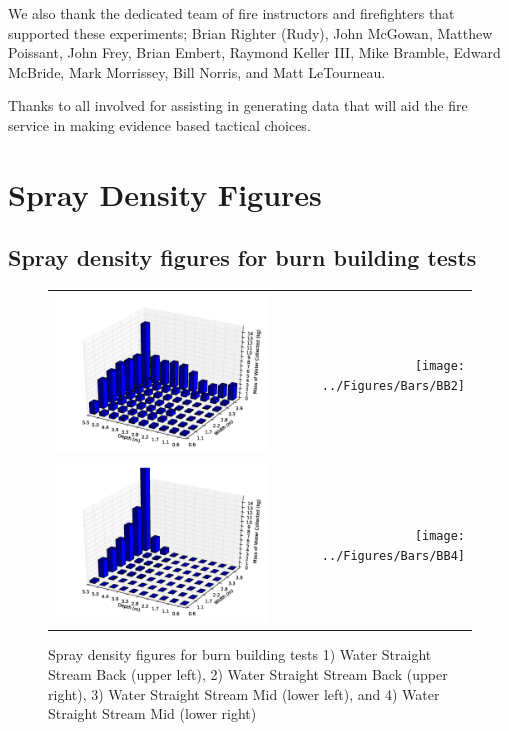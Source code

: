 \documentclass[12pt,oneside]{book}
\begin{document}
We also thank the dedicated team of fire instructors and firefighters that supported these experiments; Brian Righter (Rudy), John McGowan, Matthew Poissant, John Frey, Brian Embert, Raymond Keller III, Mike Bramble, Edward McBride, Mark Morrissey, Bill Norris, and Matt LeTourneau.

Thanks to all involved for assisting in generating data that will aid the fire service in making evidence based tactical choices.



\appendix


\chapter{Spray Density Figures}
\label{app:spray_density}

\section{Spray density figures for burn building tests}
\label{app:spray_bb}

\begin{figure}[ht]
\begin{tabular*}{\textwidth}{lr}
\includegraphics[width=3.2in]{../Figures/Bars/BB1} &
\texttt{[image: ../Figures/Bars/BB2]} \\
\includegraphics[width=3.2in]{../Figures/Bars/BB3} &
\texttt{[image: ../Figures/Bars/BB4]}
\end{tabular*}
\caption{Spray density figures for burn building tests 1) Water Straight Stream Back (upper left), 2) Water Straight Stream Back (upper right), 3) Water Straight Stream Mid (lower left), and 4) Water Straight Stream Mid (lower right)}
\label{fig:bb_1_4}
\end{figure}
\end{document}
